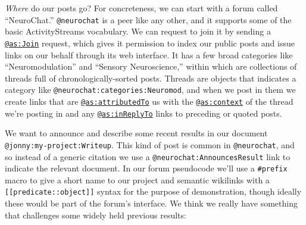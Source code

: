 \emph{Where} do our posts go? For concreteness, we can start with a
forum called ``NeuroChat.'' \texttt{@neurochat} is a peer like any
other, and it supports some of the basic ActivityStreams vocabulary. We
can request to join it by sending a
\href{https://www.w3.org/TR/activitystreams-vocabulary/\#dfn-join}{\texttt{@as:Join}}
request, which gives it permission to index our public posts and issue
links on our behalf through its web interface. It has a few broad
categories like ``Neuromodulation'' and ``Sensory Neuroscience,'' within
which are collections of threads full of chronologically-sorted posts.
Threads are objects that indicates a category like
\texttt{@neurochat:categories:Neuromod}, and when we post in them we
create links that are
\href{https://www.w3.org/TR/activitystreams-vocabulary/\#dfn-attributedto}{\texttt{@as:attributedTo}}
us with the
\href{https://www.w3.org/TR/activitystreams-vocabulary/\#dfn-context}{\texttt{@as:context}}
of the thread we're posting in and any
\href{https://www.w3.org/TR/activitystreams-vocabulary/\#dfn-inreplyto}{\texttt{@as:inReplyTo}}
links to preceding or quoted posts.

We want to announce and describe some recent results in our document
\texttt{@jonny:my-project:Writeup}. This kind of post is common in
\texttt{@neurochat}, and so instead of a generic citation we use a
\texttt{@neurochat:AnnouncesResult} link to indicate the relevant
document. In our forum pseudocode we'll use a \texttt{\#prefix} macro to
give a short name to our project and semantic wikilinks with a
\texttt{{[}{[}predicate::object{]}{]}} syntax for the purpose of
demonstration, though ideally these would be part of the forum's
interface. We think we really have something that challenges some widely
held previous results:

\begin{Shaded}
\begin{Highlighting}[]




\end{Highlighting}
\end{Shaded}

